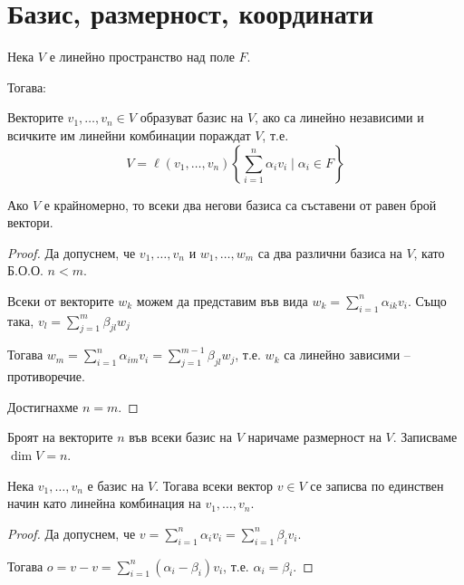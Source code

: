 \section{Базис, размерност, координати}

Нека $V$ е линейно пространство над поле $F$.

Тогава:
\begin{definition}[Базис]
    Векторите $v_1,\dots,v_n \in V$ образуват базис на $V$, ако са линейно независими и всичките им линейни комбинации пораждат $V$, т.е.
    \[V = \ell(v_1,\dots,v_n) \left\{\sum_{i=1}^n \alpha_iv_i \mid \alpha_i \in F\right\}\]
\end{definition}

\begin{theorem}
    Ако $V$ е крайномерно, то всеки два негови базиса са съставени от равен брой вектори.
    \begin{proof}
        Да допуснем, че $v_1,\dots,v_n$ и $w_1,\dots,w_m$ са два различни базиса на $V$, като Б.О.О. $n < m$.

        Всеки от векторите $w_k$ можем да представим във вида $w_k = \displaystyle\sum_{i=1}^n\alpha_{ik}v_i$.
        Също така, $v_l = \displaystyle\sum_{j=1}^m\beta_{jl}w_j$

        Тогава $w_{m} = \displaystyle\sum_{i=1}^n\alpha_{im}v_i = \displaystyle\sum_{j=1}^{m-1}\beta_{jl}w_j$, т.е. $w_k$ са линейно зависими -- противоречие.

        Достигнахме $n = m$.
    \end{proof}
\end{theorem}

\begin{definition}[Размерност]
    Броят на векторите $n$ във всеки базис на $V$ наричаме размерност на $V$. Записваме $\dim V = n$.
\end{definition}

\begin{theorem}
    Нека $v_1,\dots,v_n$ е базис на $V$. Тогава всеки вектор $v \in V$ се записва по единствен начин като линейна комбинация на $v_1,\dots,v_n$.
    \begin{proof}
        Да допуснем, че $v = \displaystyle\sum_{i=1}^n\alpha_iv_i = \displaystyle\sum_{i=1}^n\beta_iv_i$.
        
        Тогава $o = v - v = \displaystyle\sum_{i=1}^n(\alpha_i - \beta_i)v_i$, т.е. $\alpha_i = \beta_i$.
    \end{proof}
\end{theorem}

